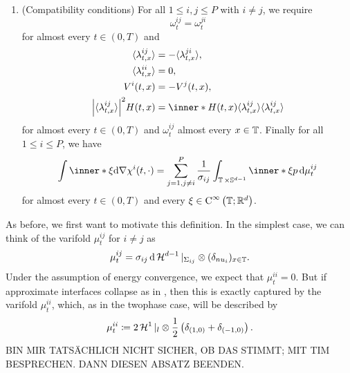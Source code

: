 \begin{definition}
\begin{enumerate}
	\item (Compatibility conditions)
	For all $ 1 \leq i , j \leq P $ with $ i \neq j $, we require 
	\begin{equation}
		\label{varifold_symmetry_of_energy_measures}
		\omega_{ t }^{ i j }
		=
		\omega_{ t }^{ j i } 
	\end{equation}
	for almost every $ t \in ( 0 , T ) $ and
	\begin{align}
		\label{varifold_symmetry_expectations}
		\langle \lambda_{ t, x  }^{ i j } \rangle
		&= 
		- \langle \lambda_{ t, x  }^{ j i } \rangle,
		\\
		\label{varifold_expecation_of_ii_zero}
		\langle \lambda_{ t , x }^{ i i } \rangle
		&= 
		0,
		\\
		\label{varifold_symmetry_velocities}
		V^{ i } ( t, x ) 
		&= 
		- V^{ j } ( t, x ),
		\\
		\label{varifold_mean_curvature_points_in_normal_direction}
		\abs{ \langle \lambda_{ t , x }^{ i j } \rangle }^{ 2 }
		H ( t, x )
		& =
		\inner*{ H( t , x ) }{ \langle \lambda_{ t , x }^{ i j } \rangle }
		\langle \lambda_{ t , x }^{ i j } \rangle
	\end{align}
	for almost every $ t \in ( 0 , T ) $ and $ \omega_{ t }^{ i j } $ 
	almost every $ x \in \operatorname{\mathbb{T}} $. Finally for all $ 1 \leq i \leq P $, we 
	have
	\begin{equation}
		\label{varifold_compatibility_condition_multiphase}
		\int
			\inner*{ \xi }{ \dd{ \nabla \chi^{ i } ( t , \cdot ) } }
		=
		\sum_{ j = 1 , j \neq i }^{ P }
			\frac{ 1 }{ \sigma_{ i j } }
			\int_{ \flattorus \times \mathbb{ S }^{ d - 1 } }
				\inner*{ \xi }{ p }
			\dd{ \mu_{ t }^{ i j } }
	\end{equation}
	for almost every $ t \in ( 0 , T ) $ and every $ \xi \in \operatorname{C}^{ 
	\infty } \left( \operatorname{\mathbb{T}} ; \mathbb{ R }^{ d } \right) $.
	\end{enumerate}
\end{definition}

As before, we first want to motivate this definition. In the simplest case, we 
can think of the varifold $ \mu_{ t }^{ i j } $ for $ i \neq j $ as
\begin{equation}
	\label{varifold_simplest_case_mutliphase}
	\mu_{ t }^{ i j }
	=
	\sigma_{ i j }
	\dd{ \operatorname{\mathcal{H}}^{ d - 1 }|_{ \Sigma_{ i j } } } 
	\otimes
	( \delta_{ nu_{ i } } )_{ x \in \operatorname{\mathbb{T}} }.
\end{equation}
Under the assumption of energy convergence, we expect that $ \mu_{ t }^{ i i } 
= 0 $. But if approximate interfaces collapse as in 
, then this is exactly captured by the 
varifold $ \mu_{ t }^{ i i }$, which, as in the twophase case, will be 
described by
\begin{equation}
	\label{varifold_when_interfaces_collapse}
	\mu_{ t }^{ i i}
	\coloneqq
	2 \operatorname{\mathcal{H}}^{ 1 } |_{ l }
	\otimes
	\frac{ 1 }{ 2 } 
	\left( \delta_{ ( 1 , 0 ) } + \delta_{ ( - 1 , 0 ) } \right).
\end{equation}
BIN MIR TATSÄCHLICH NICHT SICHER, OB DAS STIMMT; MIT TIM BESPRECHEN. DANN 
DIESEN ABSATZ BEENDEN.

